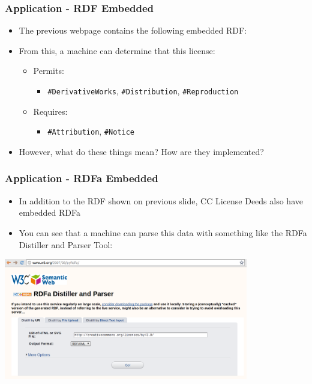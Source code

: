 \documentclass[t, xcolor=dvipsnames, 10pt]{beamer}
\begin{document}
\begin{frame}[fragile]
\frametitle{Application - RDF Embedded}
        \begin{itemize}
            \item The previous webpage contains the following embedded RDF:
        \end{itemize}

        \begin{itemize}
            \item From this, a machine can determine that this license:
            \begin{itemize}
                \item Permits:
                    \begin{itemize}
                        \item \texttt{\#DerivativeWorks}, \texttt{\#Distribution}, \texttt{\#Reproduction}
                    \end{itemize}
                \item Requires:
                    \begin{itemize}
                        \item \texttt{\#Attribution}, \texttt{\#Notice}
                    \end{itemize}
            \end{itemize}
            \item However, what do these things mean?  How are they implemented?
        \end{itemize}
\end{frame}

\begin{frame}[t]
\frametitle{Application - RDFa Embedded}
        \begin{itemize}
            \item In addition to the RDF shown on previous slide, CC License Deeds also have embedded RDFa
            \item You can see that a machine can parse this data with something
            like the RDFa Distiller and Parser Tool:
        \end{itemize}
        \begin{center}
            \includegraphics[width=0.8\textwidth]{resources/RDF/RDFa-distiller.png}
        \end{center}
\end{frame}
\end{document}
